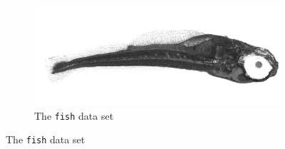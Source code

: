 \clearpage

\begin{figure}
\centering
\begin{subfigure}{.9\textwidth}
\centering
    \includegraphics[width=\textwidth]{figures/fish-mm.png} 
    \caption{The \texttt{fish} data set}
    \label{fig:dataset-fish}
\end{subfigure}


\end{figure}
